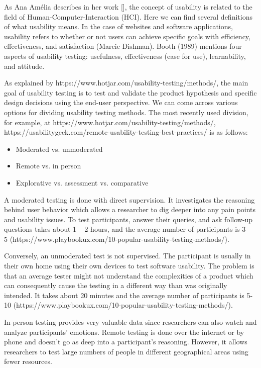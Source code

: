 \documentclass[a4paper,10pt,twoside]{article}
\begin{document}
\noindent As Ana Amélia describes in her work [], the concept of usability is related to the field of Human-Computer-Interaction (HCI). Here we can find several definitions of what usability means. In the case of websites and software applications, usability refers to whether or not users can achieve specific goals with efficiency, effectiveness, and satisfaction (Marcie Dishman). Booth (1989) mentions four aspects of usability testing: usefulness, effectiveness (ease for use), learnability, and attitude.

As explained by https://www.hotjar.com/usability-testing/methods/, the main goal of usability testing is to test and validate the product hypothesis and specific design decisions using the end-user perspective. We can come across various options for dividing usability testing methods. The most recently used division, for example, at https://www.hotjar.com/usability-testing/methods/, https://usabilitygeek.com/remote-usability-testing-best-practices/ is as follows:

\begin{itemize}
\item	Moderated vs. unmoderated
\item	Remote vs. in person
\item	Explorative vs. assessment vs. comparative
\end{itemize}

\noindent A moderated testing is done with direct supervision. It investigates the reasoning behind user behavior which allows a researcher to dig deeper into any pain points and usability issues. To test participants, answer their queries, and ask follow-up questions takes about 1 – 2 hours, and the average number of participants is 3 – 5 (https://www.playbookux.com/10-popular-usability-testing-methods/).

Conversely, an unmoderated test is not supervised. The participant is usually in their own home using their own devices to test software usability. The problem is that an average tester might not understand the complexities of a product which can consequently cause the testing in a different way than was originally intended. It takes about 20 minutes and the average number of participants is 5- 10 (https://www.playbookux.com/10-popular-usability-testing-methods/).

In-person testing provides very valuable data since researchers can also watch and analyze participants’ emotions.
Remote testing is done over the internet or by phone and doesn’t go as deep into a participant’s reasoning. However, it allows researchers to test large numbers of people in different geographical areas using fewer resources.
\end{document}
